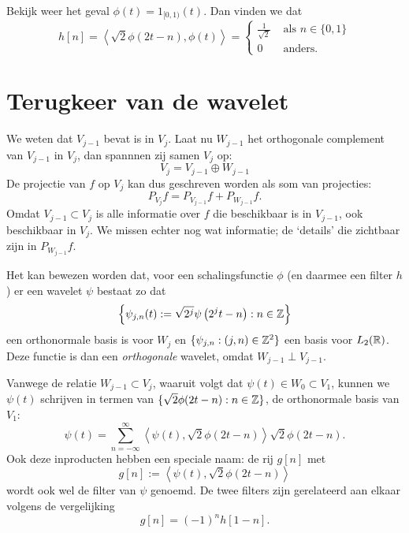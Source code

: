 \begin{voorbeeld}
  Bekijk weer het geval $\phi(t) = 1_{[0,1)}(t)$. Dan vinden we dat
    \[
    h[n] = \left\langle \sqrt{2} \phi\left(2t-n\right), \phi(t) \right\rangle = \begin{cases} \frac{1}{\sqrt{2}} & \text{ als } n \in \{0,1\} \\ 0 & \text{ anders.} \end{cases}
    \]
\end{voorbeeld}

\section{Terugkeer van de wavelet}
We weten dat $V_{j-1}$ bevat is in $V_{j}$. Laat nu $W_{j-1}$ het orthogonale complement van $V_{j-1}$ in $V_{j}$,
dan spannnen zij samen $V_j$ op:
\begin{equation}
  \label{ruimterec}
  V_{j} = V_{j-1} \oplus W_{j-1} 
\end{equation}
De projectie van $f$ op $V_{j}$ kan dus geschreven worden als som van projecties:
\begin{equation}
  \label{projectie_rec}
  P_{V_{j}} f = P_{V_{j-1}} f + P_{W_{j-1}} f.
\end{equation}
Omdat $V_{j-1} \subset V_{j}$ is alle informatie over $f$ die beschikbaar is in $V_{j-1}$, ook beschikbaar in $V_{j}$. 
We missen echter nog wat informatie; de `details' die zichtbaar zijn in $P_{W_{j-1}} f$.

Het kan bewezen worden \cite[T7.3]{mallat} dat, voor een schalingsfunctie $\phi$ (en daarmee een filter $h$) 
er een wavelet $\psi$ bestaat zo dat
\[
\left\{ \psi_{j,n}(t) := \sqrt{2^j} \psi\left(2^jt - n\right) : n \in \mathbb{Z} \right\}
\] 
een orthonormale basis is voor $W_j$ en $\{ \psi_{j,n}: (j,n) \in \mathbb{Z}^2 \}$ een basis voor $L_2(\mathbb{R})$. 
Deze functie is dan een \emph{orthogonale} wavelet, omdat $W_{j-1} \perp V_{j-1}$.

Vanwege de relatie $W_{j-1} \subset V_{j}$, waaruit volgt dat $\psi(t) \in W_0 \subset V_1$,
kunnen we $\psi(t)$ schrijven in termen van  $\{ \sqrt{2}\phi(2t-n): n \in \mathbb{Z} \}$, de orthonormale basis van $V_1$: 
\[
\psi\left(t\right) = \sum_{n=-\infty}^{\infty} \left\langle \psi\left(t\right), \sqrt{2}\phi(2t-n) \right\rangle \sqrt{2}\phi(2t-n).
\]
Ook deze inproducten hebben een speciale naam: de rij $g[n]$ met
\[
g[n] := \left\langle \psi\left(t\right), \sqrt{2}\phi(2t-n) \right\rangle
\]
wordt ook wel de filter van $\psi$ genoemd. 
De twee filters zijn gerelateerd aan elkaar volgens de vergelijking \cite[V13]{wavelet_filter}\cite[P958]{daubechies}
\begin{equation}
\label{highpassfilter}
g[n] = (-1)^{n}h[1-n].
\end{equation}


